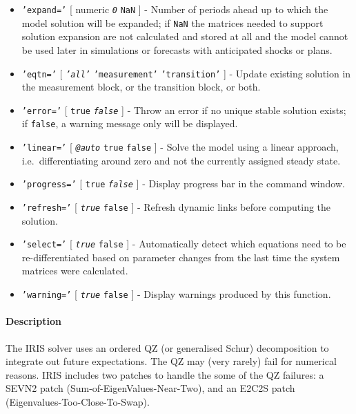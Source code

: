 \begin{itemize}
\item
  \texttt{'expand='} {[} numeric \textbar{} \emph{\texttt{0}} \textbar{}
  \texttt{NaN} {]} - Number of periods ahead up to which the model
  solution will be expanded; if \texttt{NaN} the matrices needed to
  support solution expansion are not calculated and stored at all and
  the model cannot be used later in simulations or forecasts with
  anticipated shocks or plans.
\item
  \texttt{'eqtn='} {[} \emph{\texttt{'all'}} \textbar{}
  \texttt{'measurement'} \textbar{} \texttt{'transition'} {]} - Update
  existing solution in the measurement block, or the transition block,
  or both.
\item
  \texttt{'error='} {[} \texttt{true} \textbar{} \emph{\texttt{false}}
  {]} - Throw an error if no unique stable solution exists; if
  \texttt{false}, a warning message only will be displayed.
\item
  \texttt{'linear='} {[} \emph{\texttt{@auto}} \textbar{} \texttt{true}
  \textbar{} \texttt{false} {]} - Solve the model using a linear
  approach, i.e.~differentiating around zero and not the currently
  assigned steady state.
\item
  \texttt{'progress='} {[} \texttt{true} \textbar{}
  \emph{\texttt{false}} {]} - Display progress bar in the command
  window.
\item
  \texttt{'refresh='} {[} \emph{\texttt{true}} \textbar{} \texttt{false}
  {]} - Refresh dynamic links before computing the solution.
\item
  \texttt{'select='} {[} \emph{\texttt{true}} \textbar{} \texttt{false}
  {]} - Automatically detect which equations need to be
  re-differentiated based on parameter changes from the last time the
  system matrices were calculated.
\item
  \texttt{'warning='} {[} \emph{\texttt{true}} \textbar{} \texttt{false}
  {]} - Display warnings produced by this function.
\end{itemize}

\paragraph{Description}

The IRIS solver uses an ordered QZ (or generalised Schur) decomposition
to integrate out future expectations. The QZ may (very rarely) fail for
numerical reasons. IRIS includes two patches to handle the some of the
QZ failures: a SEVN2 patch (Sum-of-EigenValues-Near-Two), and an E2C2S
patch (Eigenvalues-Too-Close-To-Swap).

